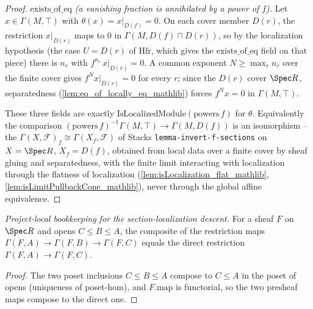 \begin{proof}
  \emph{\(\mathrm{exists\_of\_eq}\) (a vanishing fraction is annihilated by a power of \(f\)).}
  Let \(x \in \Gamma(M, \top)\) with \(\theta(x) = x|_{D(f)} = 0\). On each cover member \(D(r)\), the
  restriction \(x|_{D(r)}\) maps to \(0\) in \(\Gamma(M, D(f) \sqcap D(r))\), so by the localization
  hypothesis (the case \(U = D(r)\) of \(\mathrm{Hfr}\), which gives the \(\mathrm{exists\_of\_eq}\)
  field on that piece) there is \(n_r\) with \(f^{n_r}\, x|_{D(r)} = 0\). A common exponent
  \(N \ge \max_r n_r\) over the finite cover gives \(f^{N} x|_{D(r)} = 0\) for every \(r\); since the
  \(D(r)\) cover \(\Spec R\), separatedness (\cref{lem:eq_of_locally_eq_mathlib}) forces
  \(f^{N} x = 0\) in \(\Gamma(M, \top)\).

  These three fields are exactly \(\mathrm{IsLocalizedModule}(\mathrm{powers}\,f)\) for \(\theta\).
  Equivalently the comparison \((\mathrm{powers}\,f)^{-1}\Gamma(M, \top) \to \Gamma(M, D(f))\) is an
  isomorphism -- the \(\Gamma(X, \mathcal{F})_f \cong \Gamma(X_f, \mathcal{F})\) of Stacks
  \texttt{lemma-invert-f-sections} on \(X = \Spec R\), \(X_f = D(f)\), obtained from local data over a
  finite cover by sheaf gluing and separatedness, with the finite limit interacting with localization
  through the flatness of localization (\cref{lem:isLocalization_flat_mathlib},
  \cref{lem:isLimitPullbackCone_mathlib}), never through the global affine equivalence.
\end{proof}


\begin{lemma}

  \label{lem:res_comp}
  \textit{Project-local bookkeeping for the section-localization descent.}
  For a sheaf \(F\) on \(\Spec R\) and opens \(C \le B \le A\), the composite of the restriction maps
  \(\Gamma(F, A) \to \Gamma(F, B) \to \Gamma(F, C)\) equals the direct restriction
  \(\Gamma(F, A) \to \Gamma(F, C)\).
\end{lemma}
\begin{proof}
  The two poset inclusions \(C \le B \le A\) compose to \(C \le A\) in the poset of opens (uniqueness
  of poset-hom), and \(F.\mathrm{map}\) is functorial, so the two presheaf maps compose to the direct
  one.
\end{proof}

